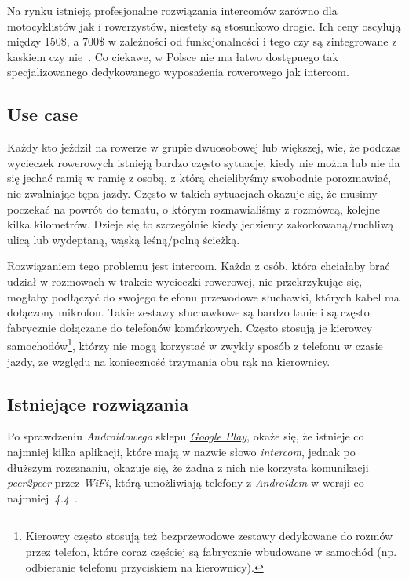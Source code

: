 \documentclass{article}
\begin{document}
Na rynku istnieją profesjonalne rozwiązania intercomów zarówno dla motocyklistów jak i rowerzystów, niestety są stosunkowo drogie. Ich ceny oscylują między 150\$, a 700\$ w zależności od funkcjonalności i tego czy są zintegrowane z kaskiem czy nie~\cite{www:bike-intercom,www:bike-intercom-mce}. Co ciekawe, w Polsce nie ma łatwo dostępnego tak specjalizowanego dedykowanego wyposażenia rowerowego jak intercom.


\subsection{Use case}

Każdy kto jeździł na rowerze w grupie dwuosobowej lub większej, wie, że podczas wycieczek rowerowych istnieją bardzo często sytuacje, kiedy nie można lub nie da się jechać ramię w ramię z osobą, z którą chcielibyśmy swobodnie porozmawiać, nie zwalniając tępa jazdy. Często w takich sytuacjach okazuje się, że musimy poczekać na powrót do tematu, o którym rozmawialiśmy z rozmówcą, kolejne kilka kilometrów. Dzieje się to szczególnie kiedy jedziemy zakorkowaną/ruchliwą ulicą lub wydeptaną, wąską leśną/polną ścieżką.

Rozwiązaniem tego problemu jest intercom. Każda z osób, która chciałaby brać udział w rozmowach w trakcie wycieczki rowerowej, nie przekrzykując się, mogłaby podłączyć do swojego telefonu przewodowe słuchawki, których kabel ma dołączony mikrofon. Takie zestawy słuchawkowe są bardzo tanie i są często fabrycznie dołączane do telefonów komórkowych. Często stosują je kierowcy samochodów\footnote{Kierowcy często stosują też bezprzewodowe zestawy dedykowane do rozmów przez telefon, które coraz częściej są fabrycznie wbudowane w samochód (np. odbieranie telefonu przyciskiem na kierownicy).}, którzy nie mogą korzystać w zwykły sposób z telefonu w czasie jazdy, ze względu na konieczność trzymania obu rąk na kierownicy.


\subsection{Istniejące rozwiązania}

Po sprawdzeniu \emph{Androidowego} sklepu \href{https://play.google.com/store}{\emph{Google Play}}, okaże się, że istnieje co najmniej kilka aplikacji, które mają w nazwie słowo \emph{intercom}, jednak po dłuższym rozeznaniu, okazuje się, że żadna z nich nie korzysta komunikacji \emph{peer2peer} przez \emph{WiFi}, którą umożliwiają telefony z \emph{Androidem} w wersji co najmniej~\emph{4.4}~\cite{www:android-wifi-p2p,www:android-wifi-p2p-tutorial}.
\end{document}
